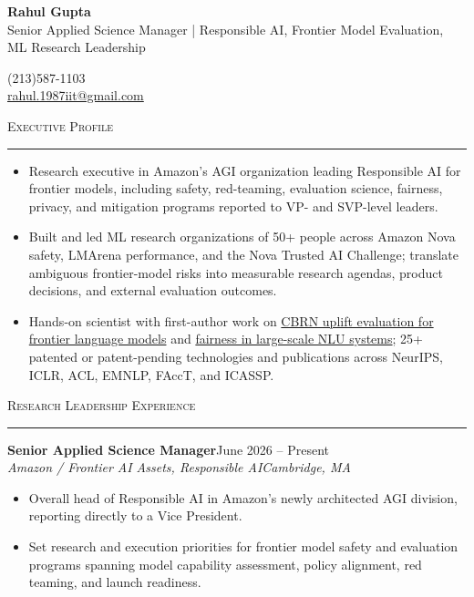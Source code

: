 \documentclass[11pt]{article}
\newcommand{\sectionheading}[1]{%
  \vspace{8pt}%
  {\large\scshape #1}\par\vspace{1pt}\hrule\vspace{3pt}%
}
\newcommand{\resumeentry}[5]{%
  \textbf{#1}\hfill #2\\
  \textit{#3}\hfill \textit{#4}
  \begin{itemize}
    #5
  \end{itemize}
  \vspace{2pt}
}
\newcommand{\socialicons}{%
  \href{https://www.linkedin.com/in/rahul-gupta-16139818}{\textcolor[HTML]{0077B5}{\Large\faLinkedin}}%
  \hspace{0.55em}%
  \href{https://scholar.google.com/citations?user=gSTLsFcAAAAJ}{\textcolor[HTML]{4285F4}{\Large\aiGoogleScholarSquare}}%
}
\begin{document}
\begin{center}
  {\LARGE\bfseries Rahul Gupta}\\[4pt]
  {\large Senior Applied Science Manager | Responsible AI, Frontier Model Evaluation, ML Research Leadership}
\end{center}

\vspace{10pt}

\begin{minipage}[t]{0.48\textwidth}
  (213)587-1103\\
  \href{mailto:rahul.1987iit@gmail.com}{rahul.1987iit@gmail.com}
\end{minipage}
\hfill
\begin{minipage}[t]{0.48\textwidth}
  \raggedleft
  \socialicons
\end{minipage}

\sectionheading{Executive Profile}
\begin{itemize}
  \item Research executive in Amazon's AGI organization leading Responsible AI for frontier models, including safety, red-teaming, evaluation science, fairness, privacy, and mitigation programs reported to VP- and SVP-level leaders.
  \item Built and led ML research organizations of 50+ people across Amazon Nova safety, LMArena performance, and the Nova Trusted AI Challenge; translate ambiguous frontier-model risks into measurable research agendas, product decisions, and external evaluation outcomes.
  \item Hands-on scientist with first-author work on \href{https://arxiv.org/abs/2607.12200}{CBRN uplift evaluation for frontier language models} and \href{https://dl.acm.org/doi/abs/10.1145/3539597.3575785}{fairness in large-scale NLU systems}; 25+ patented or patent-pending technologies and publications across NeurIPS, ICLR, ACL, EMNLP, FAccT, and ICASSP.
\end{itemize}

\sectionheading{Research Leadership Experience}

\resumeentry
  {Senior Applied Science Manager}
  {June 2026 -- Present}
  {Amazon / Frontier AI Assets, Responsible AI}
  {Cambridge, MA}
  {\item Overall head of Responsible AI in Amazon's newly architected AGI division, reporting directly to a Vice President.
   \item Set research and execution priorities for frontier model safety and evaluation programs spanning model capability assessment, policy alignment, red teaming, and launch readiness.}
\end{document}
